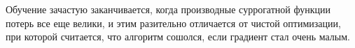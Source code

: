 \documentclass[%
	11pt,
	a4paper,
	utf8,
]{article}
\begin{document}
Обучение зачастую заканчивается, когда производные суррогатной функции потерь все еще велики, и этим разительно отличается от чистой оптимизации, при которой считается, что алгоритм сошолся, если градиент стал очень малым.











\begin{thebibliography}{99}
	
\end{thebibliography}


\end{document}
